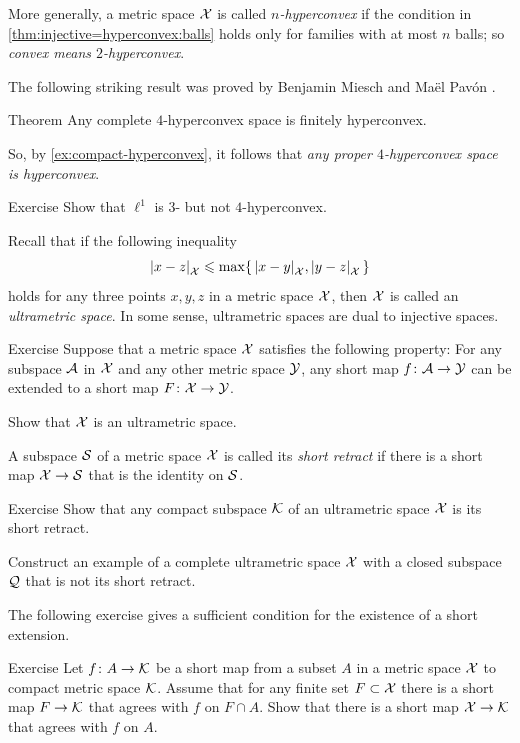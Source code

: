 More generally, a metric space $\mathcal{X}$ is called \emph{$n$-hyperconvex} if the condition in \ref{thm:injective=hyperconvex:balls} holds only for families with at most $n$ balls; so \textit{convex means $2$-hyperconvex}.

The following striking result was proved by Benjamin Miesch and Maël Pavón \cite{miesch-pavon2016}.

\begin{thm}{Theorem}
Any complete $4$-hyperconvex space is finitely hyperconvex.
\end{thm}

So, by \ref{ex:compact-hyperconvex}, it follows that \textit{any proper $4$-hyperconvex space is hyperconvex}.

\begin{thm}{Exercise}\label{ex:3-4-hypreconvex}
Show that $\ell^1$ is $3$- but not $4$-hyperconvex.
\end{thm}
 

Recall that if the following inequality
\[\dist{x}{z}{\spc{X}}
\le
\max\{\,\dist{x}{y}{\spc{X}},\dist{y}{z}{\spc{X}}\,\}\]
holds for any three points $x,y,z$ in a metric space $\mathcal{X}$,
then $\mathcal{X}$ is called an \emph{ultrametric space}.
In some sense, ultrametric spaces are dual to injective spaces.

\begin{thm}{Exercise}\label{ex:ultrametric}
Suppose that a metric space $\mathcal{X}$ satisfies the following property:
For any subspace $\mathcal{A}$ in $\mathcal{X}$ and any other metric space $\mathcal{Y}$, any short map $f\colon\mathcal{A}\to \mathcal{Y}$ can be extended to a short map $F\colon\mathcal{X}\to \mathcal{Y}$.

Show that $\mathcal{X}$ is an ultrametric space.
\end{thm}

A subspace $\mathcal{S}$ of a metric space $\mathcal{X}$ is called its \emph{short retract} if there is a short map $\mathcal{X}\to \mathcal{S}$ that is the identity on $\mathcal{S}$.

\begin{thm}{Exercise}\label{ex:ultrametric-converse}
Show that any compact subspace $\mathcal{K}$ of an ultrametric space $\mathcal{X}$ is its short retract.

Construct an example of a complete ultrametric space $\mathcal{X}$ with a closed subspace $\mathcal{Q}$ that is not its short retract.
\end{thm}

The following exercise gives a sufficient condition for the existence of a short extension.

\begin{thm}{Exercise}\label{ex:petrunin-stadler}
Let $f\:A\z\to \spc{K}$ be a short map from a subset $A$ in a metric space $\mathcal{X}$ to compact metric space $\mathcal{K}$.
Assume that for any finite set $F\subset \mathcal{X}$ there is a short map $F\to \mathcal{K}$ that agrees with $f$ on $F\cap A$.
Show that there is a short map $\mathcal{X}\to \mathcal{K}$ that agrees with $f$ on $A$.
\end{thm}
